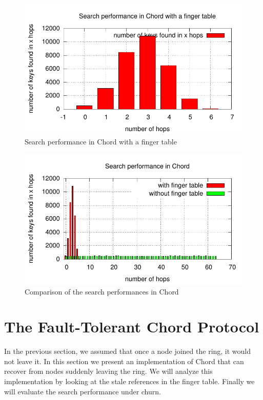 \documentclass[a4paper, 11pt]{article}
\theoremstyle{plain}
\theoremstyle{definition}
\begin{document}
    \begin{figure}[h]
      \centering
      \includegraphics{plots/task2-5-cluster.pdf}
      \caption{Search performance in Chord with a finger table}
      \label{fig:search-perf-chord-fing-table}
    \end{figure}

    \begin{figure}[h]
      \centering
      \includegraphics{plots/task2-5-cluster-compar.pdf}
      \caption{Comparison of the search performances in Chord}
      \label{fig:comp-search-chord}
    \end{figure}


\section{The Fault-Tolerant Chord Protocol}
\label{sec:fault-tolerant-chord}

  In the previous section, we assumed that once a node joined the ring, it would not leave it. In this section
  we present an implementation of Chord that can recover from nodes suddenly leaving the ring. We will analyze
  this implementation by looking at the stale references in the finger table. Finally we will evaluate the
  search performance under churn.
\end{document}
